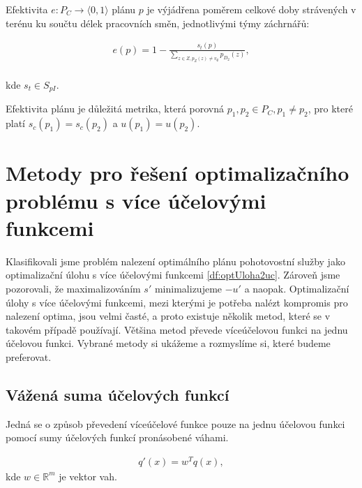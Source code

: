 \begin{definice}
  Efektivita $e \colon P_C \rightarrow \langle 0, 1 \rangle$ plánu $p$ je výjádřena poměrem celkové doby strávených v terénu ku součtu délek pracovních směn, jednotlivými týmy záchrnářů:

  \begin{align*}
    e(p) = 1 - \frac{s_t(p)}{\sum_{z \in Z, p_Z(z) \neq v_{\emptyset}} p_{D_2}(z)},
  \end{align*}
  \\
  kde $s_t \in S_{pI}$.
  \\
\end{definice}

Efektivita plánu je důležitá metrika, která porovná $p_1, p_2 \in P_C, p_1 \neq p_2$, pro které platí $s_c(p_1) = s_c(p_2)$ a $u(p_1) = u(p_2)$.

\begin{definice}
\end{definice}

\section{Metody pro řešení optimalizačního problému s více účelovými funkcemi}\label{kap:metodyProReseniOptSViceUcel}

Klasifikovali jsme problém nalezení optimálního plánu pohotovostní služby jako optimalizační úlohu s více účelovými funkcemi \ref{df:optUloha2uc}.
Zároveň jsme pozorovali, že maximalizováním $s'$ minimalizujeme $-u'$ a naopak.
Optimalizační úlohy s více účelovými funkcemi, mezi kterými je potřeba nalézt kompromis pro nalezení optima, jsou velmi časté,
a proto existuje několik metod, které se v takovém případě používají.
Většina metod převede víceúčelovou funkci na jednu účelovou funkci.
Vybrané metody si ukážeme a rozmyslíme si, které budeme preferovat. 

\subsection{Vážená suma účelových funkcí}\label{kap:vazenaSumaUcelF}

Jedná se o způsob převedení víceúčelové funkce pouze na jednu účelovou funkci pomocí sumy účelových funkcí pronásobené váhami.

\begin{definice}
  \begin{align*}
    q'(x) = w^T q(x),
  \end{align*}
  kde $w \in \mathbb{R}^m$ je vektor vah.
  \\
\end{definice}


